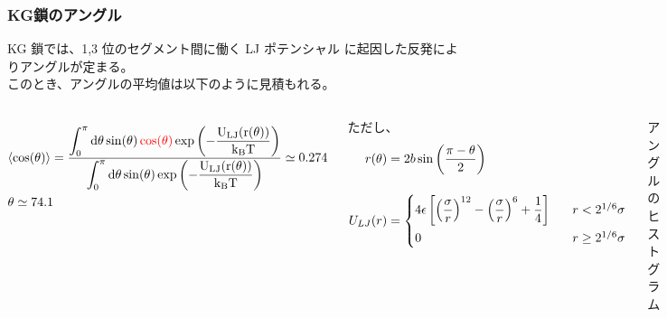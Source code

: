 \documentclass[11pt, dvipdfmx]{beamer}
\begin{document}
\begin{frame}
\frametitle{KG鎖のアングル}

\small
KG 鎖では、1,3 位のセグメント間に働く LJ ポテンシャル に起因した反発によりアングルが定まる。\\
このとき、アングルの平均値は以下のように見積もれる。


\begin{columns}[totalwidth=1\textwidth]
\tiny
\begin{align*}
&\langle \cos (\theta) \rangle 
= \dfrac{
\displaystyle \int_0^{\pi} \rm{d} \theta 
\sin(\theta) 
\color{red}
\cos(\theta)
\color{black} 
\exp \left(-\dfrac{U_{LJ}(r(\theta))}{k_B T}\right)
}
{\displaystyle \int_0^{\pi} \rm{d} \theta 
\sin(\theta) \exp \left(-\dfrac{U_{LJ}(r(\theta))}{k_B T}\right)}
\simeq 0.274 \notag \\
&\theta \simeq 74.1
\end{align*}

ただし、
\begin{align*}
r(\theta)&=2b \sin \left( \dfrac{\pi-\theta}{2} \right) \notag \\[12pt]
U_{LJ}(r) &= 
\begin{cases}
4 \epsilon\left[\left(\dfrac{\sigma}{r}\right)^{12} - \left(\dfrac{\sigma}{r}\right)^{6} + \dfrac{1}{4} \right] \;\;\; & r< 2^{1/6} \sigma \\[8pt]
0 \;\;\; & r \geq 2^{1/6} \sigma
\end{cases}
\end{align*}

\begin{center}
\small
アングルのヒストグラム
\end{center}

\vspace{-10mm}
\begin{figure}
\centering
\includegraphics[width=50mm]{./fig/Angle_Init.pdf}
\end{figure}
\end{columns}

\end{frame}
\end{document}
